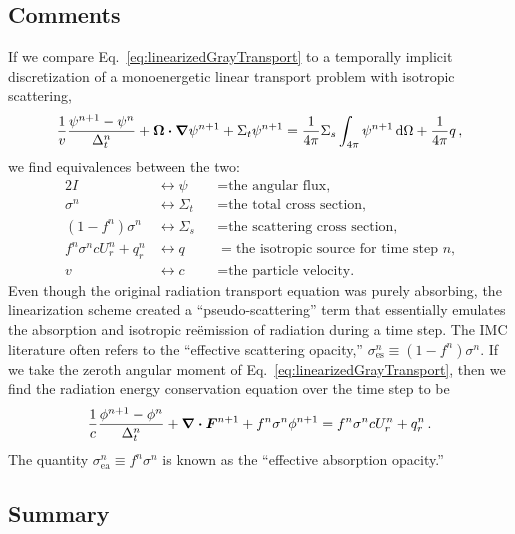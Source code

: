 \subsection{Comments}\label{bgSIComments}
If we compare Eq.~\eqref{eq:linearizedGrayTransport} to a temporally implicit
discretization of a monoenergetic linear transport problem with isotropic
scattering,
\begin{equation*}
  \frac{1}{v} \frac{\psi^{n+1} - \psi^n}{\Delta_t^n} 
  + \bm{\Omega} \bm{\cdot} \bm{\nabla} \psi^{n+1}
 + \Sigma_t \psi^{n+1}
 = \frac{1}{4\pi} \Sigma_s \int_{4\pi} \psi^{n+1}\mathop{}\!\mathrm{d} \Omega
  + \frac{1}{4\pi} q \,,
\end{equation*}
we find equivalences between the two:
\begin{alignat*}{2}
  I &\leftrightarrow \psi &&= \text{the angular flux,}
  \\
  \sigma^n &\leftrightarrow \Sigma_t &&= \text{the total cross section,}
  \\
  \left(1 - f^n\right) \sigma^n &\leftrightarrow \Sigma_s &&= \text{the scattering cross
  section,} 
  \\
  f^n \sigma^n c U_r^n + q_r^n &\leftrightarrow q &&= \text{the isotropic source for time
  step $n$,}
  \\
  v   &\leftrightarrow c &&= \text{the particle velocity.}
\end{alignat*}
Even though the original radiation transport equation was purely
absorbing, the linearization scheme created a ``pseudo-scattering''
term that essentially emulates the absorption and isotropic re\"emission of
radiation during a time step. The IMC literature often refers to the
``effective scattering opacity,''
$\sigma_\text{es}^n \equiv \left(1 - f^n\right) \sigma^n$.
If we take the zeroth angular moment of
Eq.~\eqref{eq:linearizedGrayTransport}, then we find the radiation
energy conservation equation over the time step to be
\begin{equation}\label{eq:semiImplicitZeroth}
  \frac{1}{c} \frac{\phi^{n+1} - \phi^n}{\Delta_t^n}
  + \bm{\nabla} \bm{\cdot} \bm{F}^{n+1} + f^n\sigma^n \phi^{n+1}
 =  f^n \sigma^n c U_r^n + q_r^n\,.
\end{equation}
The quantity $\sigma_\text{ea}^n \equiv f^n\sigma^n$ is known as the
``effective absorption opacity.''

\subsection{Summary}

